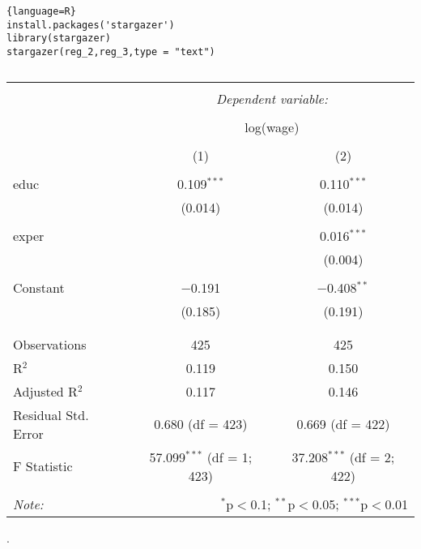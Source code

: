 \documentclass[12pt]{article}%
\begin{document}
\begin{lstlisting}{language=R}
install.packages('stargazer')
library(stargazer)
stargazer(reg_2,reg_3,type = "text")
\end{lstlisting}

\begin{table}[!htbp] \centering 
  \caption{} 
  \label{} 
\begin{tabular}{@{\extracolsep{5pt}}lcc} 
\\[-1.8ex]\hline 
\hline \\[-1.8ex] 
 & \multicolumn{2}{c}{\textit{Dependent variable:}} \\ 
\cline{2-3} 
\\[-1.8ex] & \multicolumn{2}{c}{log(wage)} \\ 
\\[-1.8ex] & (1) & (2)\\ 
\hline \\[-1.8ex] 
 educ & 0.109$^{***}$ & 0.110$^{***}$ \\ 
  & (0.014) & (0.014) \\ 
  & & \\ 
 exper &  & 0.016$^{***}$ \\ 
  &  & (0.004) \\ 
  & & \\ 
 Constant & $-$0.191 & $-$0.408$^{**}$ \\ 
  & (0.185) & (0.191) \\ 
  & & \\ 
\hline \\[-1.8ex] 
Observations & 425 & 425 \\ 
R$^{2}$ & 0.119 & 0.150 \\ 
Adjusted R$^{2}$ & 0.117 & 0.146 \\ 
Residual Std. Error & 0.680 (df = 423) & 0.669 (df = 422) \\ 
F Statistic & 57.099$^{***}$ (df = 1; 423) & 37.208$^{***}$ (df = 2; 422) \\ 
\hline 
\hline \\[-1.8ex] 
\textit{Note:}  & \multicolumn{2}{r}{$^{*}$p$<$0.1; $^{**}$p$<$0.05; $^{***}$p$<$0.01} \\ 
\end{tabular} 
\end{table} 

\pagebreak
.
\pagebreak 
\end{document}
